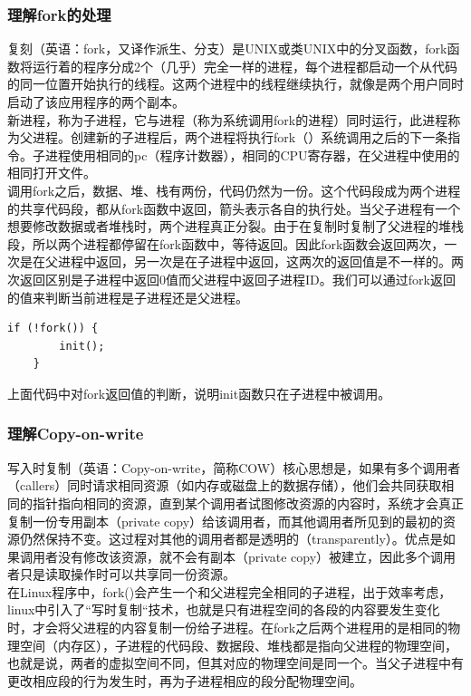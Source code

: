 \documentclass[12pt]{article}
\begin{document}
\subsubsection{理解fork的处理}
复刻（英语：fork，又译作派生、分支）是UNIX或类UNIX中的分叉函数，fork函数将运行着的程序分成2个（几乎）完全一样的进程，每个进程都启动一个从代码的同一位置开始执行的线程。这两个进程中的线程继续执行，就像是两个用户同时启动了该应用程序的两个副本。\\
新进程，称为子进程，它与进程（称为系统调用fork的进程）同时运行，此进程称为父进程。创建新的子进程后，两个进程将执行fork（）系统调用之后的下一条指令。子进程使用相同的pc（程序计数器），相同的CPU寄存器，在父进程中使用的相同打开文件。\\
调用fork之后，数据、堆、栈有两份，代码仍然为一份。这个代码段成为两个进程的共享代码段，都从fork函数中返回，箭头表示各自的执行处。当父子进程有一个想要修改数据或者堆栈时，两个进程真正分裂。由于在复制时复制了父进程的堆栈段，所以两个进程都停留在fork函数中，等待返回。因此fork函数会返回两次，一次是在父进程中返回，另一次是在子进程中返回，这两次的返回值是不一样的。两次返回区别是子进程中返回0值而父进程中返回子进程ID。我们可以通过fork返回的值来判断当前进程是子进程还是父进程。
\begin{lstlisting}[breaklines]
	if (!fork()) {
		init();
	}
\end{lstlisting}
上面代码中对fork返回值的判断，说明init函数只在子进程中被调用。
\subsubsection{理解Copy-on-write}	
写入时复制（英语：Copy-on-write，简称COW）核心思想是，如果有多个调用者（callers）同时请求相同资源（如内存或磁盘上的数据存储），他们会共同获取相同的指针指向相同的资源，直到某个调用者试图修改资源的内容时，系统才会真正复制一份专用副本（private copy）给该调用者，而其他调用者所见到的最初的资源仍然保持不变。这过程对其他的调用者都是透明的（transparently）。优点是如果调用者没有修改该资源，就不会有副本（private copy）被建立，因此多个调用者只是读取操作时可以共享同一份资源。\\
在Linux程序中，fork()会产生一个和父进程完全相同的子进程，出于效率考虑，linux中引入了“写时复制“技术，也就是只有进程空间的各段的内容要发生变化时，才会将父进程的内容复制一份给子进程。在fork之后两个进程用的是相同的物理空间（内存区），子进程的代码段、数据段、堆栈都是指向父进程的物理空间，也就是说，两者的虚拟空间不同，但其对应的物理空间是同一个。当父子进程中有更改相应段的行为发生时，再为子进程相应的段分配物理空间。
\end{document}
